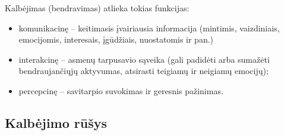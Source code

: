Kalbėjimas (bendravimas) atlieka tokias funkcijas:
\begin{itemize}
  \item komunikacinę – keitimasis įvairiausia informacija (mintimis,
    vaizdiniais, emocijomis, interesais, įgūdžiais, nuostatomis ir
    pan.)
  \item interakcinę – asmenų tarpusavio sąveika (gali padidėti arba 
    sumažėti bendraujančiųjų aktyvumas, atsirasti teigiamų ir neigiamų
    emocijų);
  \item percepcinę – savitarpio suvokimas ir geresnis pažinimas.
\end{itemize}

\subsection{Kalbėjimo rūšys}

